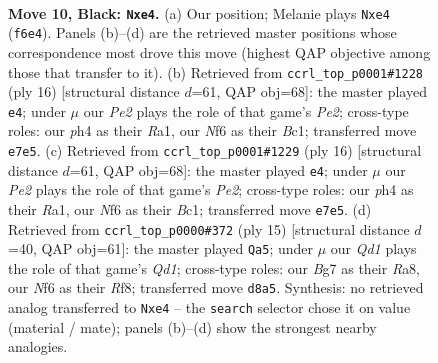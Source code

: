 \documentclass[11pt]{article}
\begin{document}
\clearpage

\begin{figure}[p]\centering
\begin{subfigure}{0.46\textwidth}\centering
\resizebox{\linewidth}{!}{%
\newchessgame
\chessboard[
  setfen={1rbqr1k1/pp1pppbp/2n2np1/8/2PNP2P/2N3P1/PP3PB1/R1BQ1RK1 b - - 0 10},
  showmover=false,
  pgfstyle=straightmove, color=movearrow, markmove={f6-e4}
]}
\caption{}
\end{subfigure}\hfill
\begin{subfigure}{0.46\textwidth}\centering
\resizebox{\linewidth}{!}{%
\newchessgame
\chessboard[
  setfen={r1bq1rk1/pp2bppp/2n1p3/2pn4/3P4/2N2NP1/PP2PPBP/R1BQ1RK1 w - - 1 9},
  showmover=false,
  pgfstyle=straightmove, color=movearrow, markmove={e2-e4}
]}
\caption{}
\end{subfigure}
\\[4pt]
\begin{subfigure}{0.46\textwidth}\centering
\resizebox{\linewidth}{!}{%
\newchessgame
\chessboard[
  setfen={r1bq1rk1/pp2bppp/2n1p3/2pn4/3P4/2N2NP1/PP2PPBP/R1BQ1RK1 w - - 1 9},
  showmover=false,
  pgfstyle=straightmove, color=movearrow, markmove={e2-e4}
]}
\caption{}
\end{subfigure}\hfill
\begin{subfigure}{0.46\textwidth}\centering
\resizebox{\linewidth}{!}{%
\newchessgame
\chessboard[
  setfen={r1bq1rk1/pp1pppbp/2n2np1/8/2PN4/2N3P1/PP2PPBP/R1BQ1RK1 b - - 6 8},
  showmover=false,
  pgfstyle=straightmove, color=movearrow, markmove={d8-a5}
]}
\caption{}
\end{subfigure}
\caption{\textbf{Move 10, Black: \texttt{Nxe4}.} (a) Our position; Melanie plays \texttt{Nxe4} (\texttt{f6e4}). Panels (b)--(d) are the retrieved master positions whose correspondence most drove this move (highest QAP objective among those that transfer to it). (b) Retrieved from \texttt{ccrl\_top\_p0001\#1228} (ply 16) [structural distance $d$=61, QAP obj=68]: the master played \texttt{e4}; under $\mu$ our \emph{Pe2} plays the role of that game's \emph{Pe2}; cross-type roles: our \emph{p}h4 as their \emph{R}a1, our \emph{N}f6 as their \emph{B}c1; transferred move \texttt{e7e5}. (c) Retrieved from \texttt{ccrl\_top\_p0001\#1229} (ply 16) [structural distance $d$=61, QAP obj=68]: the master played \texttt{e4}; under $\mu$ our \emph{Pe2} plays the role of that game's \emph{Pe2}; cross-type roles: our \emph{p}h4 as their \emph{R}a1, our \emph{N}f6 as their \emph{B}c1; transferred move \texttt{e7e5}. (d) Retrieved from \texttt{ccrl\_top\_p0000\#372} (ply 15) [structural distance $d$=40, QAP obj=61]: the master played \texttt{Qa5}; under $\mu$ our \emph{Qd1} plays the role of that game's \emph{Qd1}; cross-type roles: our \emph{B}g7 as their \emph{R}a8, our \emph{N}f6 as their \emph{R}f8; transferred move \texttt{d8a5}. Synthesis: no retrieved analog transferred to \texttt{Nxe4} -- the \texttt{search} selector chose it on value (material / mate); panels (b)--(d) show the strongest nearby analogies.}
\label{fig:thought-m19}
\end{figure}
\end{document}
